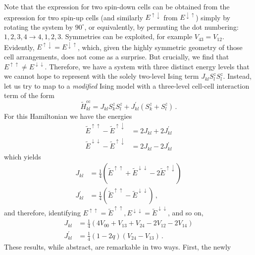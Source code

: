Note that the expression for two spin-down cells can be obtained from the
expression for two spin-up cells (and similarly $E^{\uparrow\downarrow}$ from
$E^{\downarrow\uparrow}$) simply by rotating the system by $90^{\circ}$, or
equivalently, by permuting the dot numbering: $1,2,3,4 \rightarrow 4,1,2,3$.
Symmetries can be exploited, for example $V_{43} = V_{12}$. Evidently,
$E^{\uparrow\downarrow} = E^{\downarrow\uparrow}$, which, given the highly
symmetric geometry of those cell arrangements, does not come as a surprise. But
crucially, we find that $E^{\uparrow\uparrow} \ne E^{\downarrow\downarrow}$.
Therefore, we have a system with three distinct energy levels that we cannot
hope to represent with the solely two-level Ising term $J_{kl} S^z_l S^z_l$.
Instead, let us try to map to a \emph{modified} Ising model with a three-level
cell-cell interaction term of the form
%
\begin{equation}
  \label{eq:Ising_term}
  \tilde{H}^\text{cc}_{kl}
  = 
  J_{kl} S^z_k S^z_l + 
  J^{\prime}_{kl} \left( S^z_k + S^z_l \right) \, .
\end{equation}
%
For this Hamiltonian we have the energies
%
\begin{align}
  \tilde{E}^{\uparrow\uparrow} - \tilde{E}^{\uparrow\downarrow}
  &=
  2J_{kl} + 2J^{\prime}_{kl} \\
  \tilde{E}^{\downarrow\downarrow} - \tilde{E}^{\uparrow\downarrow}
  &=
  2J_{kl} - 2J^{\prime}_{kl}
\end{align}
%
which yields
%
\begin{align}
  \label{eq:Js_from_Es}
  J_{kl}
  &=
  \frac{1}{4} 
  \left( 
    \tilde{E}^{\uparrow\uparrow} + \tilde{E}^{\downarrow\downarrow}
    - 2 \tilde{E}^{\uparrow\downarrow} 
  \right) \\
  J^{\prime}_{kl}
  &=
  \frac{1}{4}
  \left( \tilde{E}^{\uparrow\uparrow} - \tilde{E}^{\downarrow\downarrow} \right) \, ,
\end{align}
%
and therefore, identifying $E^{\uparrow\uparrow} = \tilde{E}^{\uparrow\uparrow},
E^{\downarrow\downarrow} = \tilde{E}^{\downarrow\downarrow}$, and so on,
\begin{align}
  \label{eq:J}
  J_{kl}
  &=
  \frac{1}{4} 
  \left(
    4 V_{00} + V_{13} + V_{24} - 2 V_{12} - 2 V_{14}
  \right) \\
  \label{eq:Jprime}
  J^{\prime}_{kl}
  &=
  \frac{1}{4}
  \left( 1 - 2 q \right)
  \left( V_{24} - V_{13} \right) \, .
\end{align}
These results, while abstract, are remarkable in two ways. First, the newly
